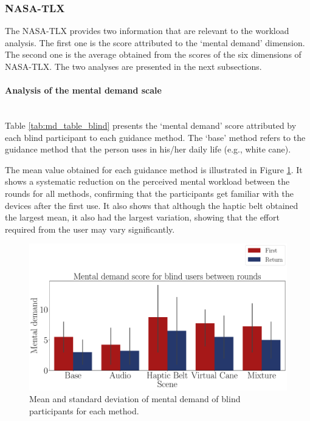 \subsubsection{NASA-TLX}
\label{subsubsec:results_nasa_tlx_1}

The NASA-TLX provides two information that are relevant to the workload analysis. The first one is the score attributed to the ‘mental demand’ dimension. The second one is the average obtained from the scores of the six dimensions of NASA-TLX. The two analyses are presented in the next subsections.

\paragraph{Analysis of the mental demand scale}\mbox{}\\

Table \ref{tab:md_table_blind} presents the ‘mental demand’ score attributed by each blind participant to each guidance method. The ‘base’ method refers to the guidance method that the person uses in his/her daily life (e.g., white cane). 



The mean value obtained for each guidance method is illustrated in Figure \ref{fig:barplot_md_avg_5_scene_blind}. It shows a systematic reduction on the perceived mental workload between the rounds for all methods, confirming that the participants get familiar with the devices after the first use. It also shows that although the haptic belt obtained the largest mean, it also had the largest variation, showing that the effort required from the user may vary significantly.

\begin{figure}[!htb]
    \centering
    \includegraphics[width = 0.8\linewidth]{Resultados/Nasa/Figuras/pdf/barplot_md_avg_5_scene_blind.pdf}
    \caption{Mean and standard deviation of mental demand of blind participants for each method.}
    \label{fig:barplot_md_avg_5_scene_blind}
\end{figure}


